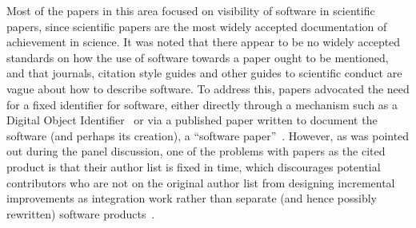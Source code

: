 \documentclass[11pt, oneside]{amsart}
\begin{document}
Most of the papers in this area focused on visibility of software in
scientific papers, since scientific papers are the most widely
accepted documentation of achievement in science. It was noted that
there appear to be no widely accepted standards on how the use of
software towards a paper ought to be mentioned, and that journals,
citation style guides and other guides to scientific conduct are vague
about how to describe software. To address this, papers advocated the
need for a fixed identifier for software, either directly through a
mechanism such as a Digital Object
Identifier~\cite{Katz2_WSSSPE,Knepley_WSSSPE} or via a published paper
written to document the software (and perhaps its creation), a
``software paper''~\cite{Chue_Hong_WSSSPE}. However, as was pointed
out during the panel discussion, one of the problems with papers as
the cited product is that their author list is fixed in time, which
discourages potential contributors who are not on the original author
list from designing incremental improvements as integration work
rather than separate (and hence possibly rewritten) software
products~\cite{howison_incentives_2013}.
\end{document}
